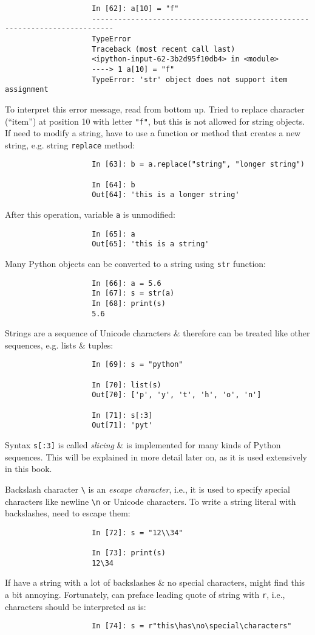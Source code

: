 \documentclass{article}
\begin{document}
\begin{itemize}
\begin{itemize}
\begin{itemize}
\begin{itemize}
\begin{verbatim}
					In [62]: a[10] = "f"
					---------------------------------------------------------------------------
					TypeError
					Traceback (most recent call last)
					<ipython-input-62-3b2d95f10db4> in <module>
					----> 1 a[10] = "f"
					TypeError: 'str' object does not support item assignment
				\end{verbatim}
				To interpret this error message, read from bottom up. Tried to replace character (``item'') at position 10 with letter {\tt"f"}, but this is not allowed for string objects. If need to modify a string, have to use a function or method that creates a new string, e.g. string {\tt replace} method:
				\begin{verbatim}
					In [63]: b = a.replace("string", "longer string")
					
					In [64]: b
					Out[64]: 'this is a longer string'
				\end{verbatim}
				After this operation, variable {\tt a} is unmodified:
				\begin{verbatim}
					In [65]: a
					Out[65]: 'this is a string'
				\end{verbatim}
				Many Python objects can be converted to a string using {\tt str} function:
				\begin{verbatim}
					In [66]: a = 5.6
					In [67]: s = str(a)
					In [68]: print(s)
					5.6
				\end{verbatim}
				Strings are a sequence of Unicode characters \& therefore can be treated like other sequences, e.g. lists \& tuples:
				\begin{verbatim}
					In [69]: s = "python"
					
					In [70]: list(s)
					Out[70]: ['p', 'y', 't', 'h', 'o', 'n']
					
					In [71]: s[:3]
					Out[71]: 'pyt'
				\end{verbatim}
				Syntax {\tt s[:3]} is called {\it slicing} \& is implemented for many kinds of Python sequences. This will be explained in more detail later on, as it is used extensively in this book.
				
				Backslash character \verb|\| is an {\it escape character}, i.e., it is used to specify special characters like newline \verb|\n| or Unicode characters. To write a string literal with backslashes, need to escape them:
				\begin{verbatim}
					In [72]: s = "12\\34"
					
					In [73]: print(s)
					12\34
				\end{verbatim}
				If have a string with a lot of backslashes \& no special characters, might find this a bit annoying. Fortunately, can preface leading quote of string with {\tt r}, i.e.,  characters should be interpreted as is:
				\begin{verbatim}
					In [74]: s = r"this\has\no\special\characters"
					

\end{verbatim}
\end{itemize}
\end{itemize}
\end{itemize}
\end{itemize}
\end{document}
